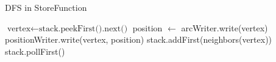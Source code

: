 \begin{algorithm}
    \caption{DFS in StoreFunction}
    \begin{algorithmic}
        \label{alg:store_dfs}
                \State $\text{vertex} \gets \text{stack.peekFirst().next()}$
                    \State position $\gets$ arcWriter.write(vertex)
                    \State positionWriter.write(vertex, position)
                    \State stack.addFirst(neighbors(vertex))
                \EndIf
            \Else
                \State stack.pollFirst()
            \EndIf
        \EndWhile
        \EndProcedure      
    \end{algorithmic}
\end{algorithm}